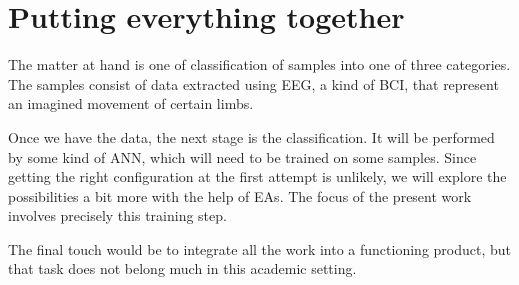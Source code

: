 \section{Putting everything together}

	The matter at hand is one of classification of samples into one of three categories. The samples consist of data extracted using \acs{EEG}, a kind of \acs{BCI}, that represent an imagined movement of certain limbs.

	Once we have the data, the next stage is the classification. It will be performed by some kind of \acs{ANN}, which will need to be trained on some samples. Since getting the right configuration at the first attempt is unlikely, we will explore the possibilities a bit more with the help of \acs{EA}s. The focus of the present work involves precisely this training step.

	The final touch would be to integrate all the work into a functioning product, but that task does not belong much in this academic setting.